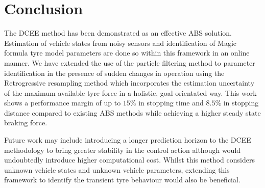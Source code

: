 \documentclass[onecolumn,journal,draftclsnofoot]{IEEEtran}
\begin{document}
\section{Conclusion} \label{conclusion}
The DCEE method has been demonstrated as an effective ABS solution. Estimation of vehicle states from noisy sensors and identification of Magic formula tyre model parameters are done so within this framework in an online manner. We have extended the use of the particle filtering method to parameter identification in the presence of sudden changes in operation using the Retrogressive resampling method which incorporates the estimation uncertainty of the maximum available tyre force in a holistic, goal-orientated way. %
This work shows a performance margin of up to $15\%$ in stopping time and $8.5\%$ in stopping distance compared to existing ABS methods while achieving a higher steady state braking force.

Future work may include introducing a longer prediction horizon to the DCEE methodology to bring greater stability in the control action although would undoubtedly introduce higher computational cost. Whilst this method considers unknown vehicle states and unknown vehicle parameters, extending this framework to identify the transient tyre behaviour would also be beneficial.

 

\end{document}
